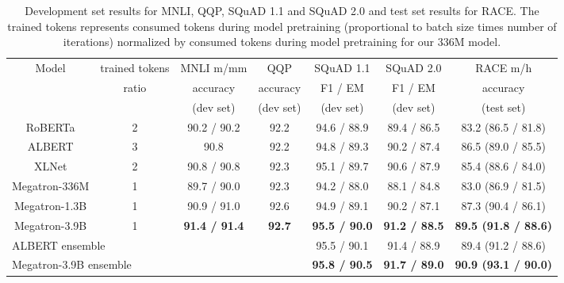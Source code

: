 \documentclass{article}
\begin{document}
\begin{table*}
\footnotesize
\begin{center}
\caption{Development set results for MNLI, QQP, SQuAD 1.1 and SQuAD 2.0 and test set results for RACE. The trained tokens represents consumed tokens during model pretraining (proportional to batch size times number of iterations) normalized by consumed tokens during model pretraining for our 336M model.}
\label{tab:bert_results}
\begin{tabular}{c|c|c|c|c|c||c} \hline \hline
\multirow{3}{*}{Model}         & trained tokens & MNLI m/mm         & QQP       & SQuAD 1.1         & SQuAD 2.0        & RACE m/h         \\
              & ratio        & accuracy         & accuracy  & F1 / EM            & F1 / EM          & accuracy         \\
                  &        & (dev set)         & (dev set)  & (dev set)           & (dev set)          & (test set)         \\\hline
RoBERTa \cite{roberta}       & 2              & 90.2 / 90.2      & 92.2      & 94.6 / 88.9        & 89.4 / 86.5      & 83.2 (86.5 / 81.8)      \\
ALBERT \cite{ALBERT2019}        & 3              & 90.8             & 92.2      & 94.8 / 89.3        & 90.2 / 87.4      & 86.5 (89.0 / 85.5)      \\
XLNet \cite{xlnet}       & 2              & 90.8 / 90.8      & 92.3      & 95.1 / 89.7   & 90.6 / 87.9      & 85.4 (88.6 / 84.0)      \\
Megatron-336M & 1              & 89.7 / 90.0      & 92.3      & 94.2 / 88.0        & 88.1 / 84.8      & 83.0 (86.9 / 81.5)      \\
Megatron-1.3B & 1              & 90.9 / 91.0      & 92.6      & 94.9 / 89.1        & 90.2 / 87.1      & 87.3 (90.4 / 86.1)      \\
Megatron-3.9B & 1           & \bf{91.4 / 91.4} & \bf{92.7} & \bf{95.5 / 90.0} & \bf{91.2 / 88.5} & \bf{89.5 (91.8 / 88.6)} \\\hline
 \multicolumn{3}{l}{ALBERT ensemble \cite{ALBERT2019} } & & 95.5 / 90.1 &91.4 / 88.9 & 89.4 (91.2 / 88.6)\\
  \multicolumn{3}{l}{Megatron-3.9B ensemble} &  &  \bf{95.8 / 90.5} & \bf{91.7 / 89.0} & \bf{90.9 (93.1 / 90.0)}\\\hline 
\end{tabular}
\end{center}
\end{table*}
\end{document}
